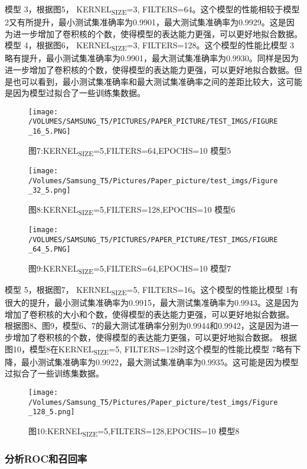 \documentclass[11pt]{article}
\begin{document}
模型 3，根据图5， KERNEL\textsubscript{SIZE}=3, FILTERS=64。这个模型的性能相较于模型 2又有所提升，最小测试集准确率为0.9901，最大测试集准确率为0.9929。这是因为进一步增加了卷积核的个数，使得模型的表达能力更强，可以更好地拟合数据。模型 4，根据图6， KERNEL\textsubscript{SIZE}=3, FILTERS=128。这个模型的性能比模型 3略有提升，最小测试集准确率为0.9901，最大测试集准确率为0.9930。同样是因为进一步增加了卷积核的个数，使得模型的表达能力更强，可以更好地拟合数据。但是也可以看到，最小测试集准确率和最大测试集准确率之间的差距比较大，这可能是因为模型过拟合了一些训练集数据。

\begin{figure}[htbp]
\centering
\texttt{[image: /VOLUMES/SAMSUNG\_T5/PICTURES/PAPER\_PICTURE/TEST\_IMGS/FIGURE\_16\_5.PNG]}
\caption{图7:KERNEL\textsubscript{SIZE}=5,FILTERS=64,EPOCHS=10 模型5}
\end{figure}

\begin{figure}[htbp]
\centering
\texttt{[image: /Volumes/Samsung\_T5/Pictures/Paper\_picture/test\_imgs/Figure\_32\_5.png]}
\caption{图8:KERNEL\textsubscript{SIZE}=5,FILTERS=128,EPOCHS=10 模型6}
\end{figure}
\begin{figure}[htbp]
\centering
\texttt{[image: /VOLUMES/SAMSUNG\_T5/PICTURES/PAPER\_PICTURE/TEST\_IMGS/FIGURE\_64\_5.PNG]}
\caption{图9:KERNEL\textsubscript{SIZE}=5,FILTERS=64,EPOCHS=10 模型7}
\end{figure}

模型 5，根据图7， KERNEL\textsubscript{SIZE}=5, FILTERS=16。这个模型的性能比模型 1有很大的提升，最小测试集准确率为0.9915，最大测试集准确率为0.9943。这是因为增加了卷积核的大小和个数，使得模型的表达能力更强，可以更好地拟合数据。
根据图8、图9，模型6、7的最大测试准确率分别为0.9944和0.9942，这是因为进一步增加了卷积核的个数，使得模型的表达能力更强，可以更好地拟合数据。
根据图10，模型8在KERNEL\textsubscript{SIZE}=5, FILTERS=128时这个模型的性能比模型 7略有下降，最小测试集准确率为0.9922，最大测试集准确率为0.9935。这可能是因为模型过拟合了一些训练集数据。
\begin{figure}[htbp]
\centering
\texttt{[image: /Volumes/Samsung\_T5/Pictures/Paper\_picture/test\_imgs/Figure\_128\_5.png]}
\caption{图10:KERNEL\textsubscript{SIZE}=5,FILTERS=128,EPOCHS=10 模型8}
\end{figure}

\subsubsection{分析ROC和召回率}
\label{sec:org373263e}
\end{document}

